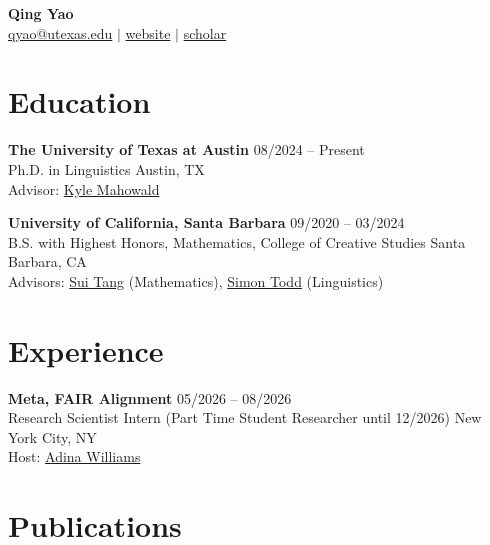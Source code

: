 \documentclass[11pt, letterpaper]{article}
\newcommand{\entry}[2]{#1 \hfill #2}
\begin{document}
\begin{center}
  {\LARGE\bfseries Qing Yao} \\[0.4em]
  \href{mailto:qyao@utexas.edu}{qyao@utexas.edu} \quad$\vert$\quad
  \href{https://dounick.github.io}{website} \quad$\vert$\quad
  \href{https://scholar.google.com/citations?user=kCe3H3YAAAAJ&hl=en}{scholar}
\end{center}

\section*{Education}

\entry{\textbf{The University of Texas at Austin}}{08/2024 -- Present} \\
\entry{Ph.D. in Linguistics}{Austin, TX} \\
Advisor: \href{https://mahowak.github.io/}{Kyle Mahowald}

\entry{\textbf{University of California, Santa Barbara}}{09/2020 -- 03/2024} \\
\entry{B.S. with Highest Honors, Mathematics, College of Creative Studies}{Santa Barbara, CA} \\
Advisors: \href{https://web.math.ucsb.edu/~suitang/}{Sui Tang} (Mathematics), \href{https://sjtodd.github.io/}{Simon Todd} (Linguistics)


\section*{Experience}
\entry{\textbf{Meta, FAIR Alignment}}{05/2026 -- 08/2026} \\
\entry{Research Scientist Intern (Part Time Student Researcher until 12/2026)}{New York City, NY} \\
Host: \href{https://ai.meta.com/people/1396973444287406/adina-williams/}{Adina Williams}


\section*{Publications}
\end{document}
